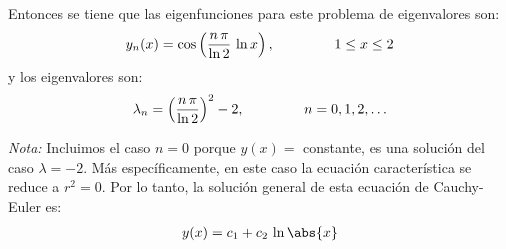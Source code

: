 \begin{ejemplo}
Entonces se tiene que las eigenfunciones para este problema de eigenvalores son:
\begin{align*}
y_{n}(x) = \cos \left( \dfrac{n \, \pi}{\ln 2} \, \ln x \right), \hspace{1.5cm} 1 \leq x \leq 2
\end{align*}
y los eigenvalores son:
\begin{align*}
\lambda_{n} = \left( \dfrac{n \, \pi}{\ln 2} \right)^{2} - 2, \hspace{1.5cm} n = 0, 1, 2, \ldots
\end{align*}

\emph{Nota:} Incluimos el caso $n = 0$ porque $y (x) =$ constante, es una solución del caso $\lambda = - 2$. Más específicamente, en este caso la ecuación característica se reduce a $r^{2} = 0$. Por lo tanto, la solución general de esta ecuación de Cauchy-Euler es:
\begin{align*}
y (x) = c_{1} + c_{2} \, \ln \abs{x}
\end{align*}


\end{ejemplo}

